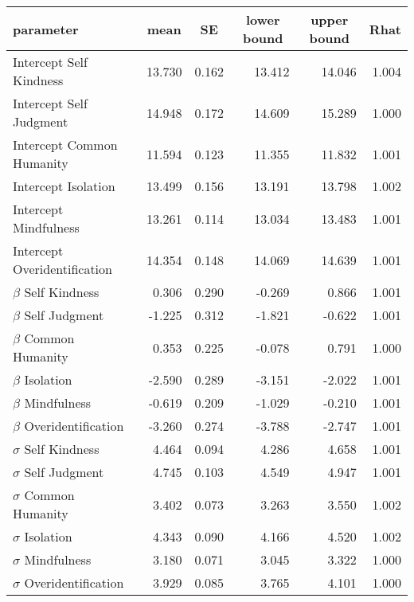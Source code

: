 \documentclass[
  man]{apa7}
\begin{document}
\begin{table}[tbp]
\begin{center}
\begin{threeparttable}
{\begin{tabular}{lrrrrr}
\toprule
parameter & \multicolumn{1}{c}{mean} & \multicolumn{1}{c}{SE} & \multicolumn{1}{c}{lower bound} & \multicolumn{1}{c}{upper bound} & \multicolumn{1}{c}{Rhat}\\
\midrule
Intercept Self Kindness & 13.730 & 0.162 & 13.412 & 14.046 & 1.004\\
Intercept Self Judgment & 14.948 & 0.172 & 14.609 & 15.289 & 1.000\\
Intercept Common Humanity & 11.594 & 0.123 & 11.355 & 11.832 & 1.001\\
Intercept Isolation & 13.499 & 0.156 & 13.191 & 13.798 & 1.002\\
Intercept Mindfulness & 13.261 & 0.114 & 13.034 & 13.483 & 1.001\\
Intercept Overidentification & 14.354 & 0.148 & 14.069 & 14.639 & 1.001\\
$\beta$ Self Kindness & 0.306 & 0.290 & -0.269 & 0.866 & 1.001\\
$\beta$ Self Judgment & -1.225 & 0.312 & -1.821 & -0.622 & 1.001\\
$\beta$ Common Humanity & 0.353 & 0.225 & -0.078 & 0.791 & 1.000\\
$\beta$ Isolation & -2.590 & 0.289 & -3.151 & -2.022 & 1.001\\
$\beta$ Mindfulness & -0.619 & 0.209 & -1.029 & -0.210 & 1.001\\
$\beta$ Overidentification & -3.260 & 0.274 & -3.788 & -2.747 & 1.001\\
$\sigma$ Self Kindness & 4.464 & 0.094 & 4.286 & 4.658 & 1.001\\
$\sigma$ Self Judgment & 4.745 & 0.103 & 4.549 & 4.947 & 1.001\\
$\sigma$ Common Humanity & 3.402 & 0.073 & 3.263 & 3.550 & 1.002\\
$\sigma$ Isolation & 4.343 & 0.090 & 4.166 & 4.520 & 1.002\\
$\sigma$ Mindfulness & 3.180 & 0.071 & 3.045 & 3.322 & 1.000\\
$\sigma$ Overidentification & 3.929 & 0.085 & 3.765 & 4.101 & 1.000\\
\bottomrule
\end{tabular}

}

\end{threeparttable}
\end{center}

\end{table}
\end{document}
